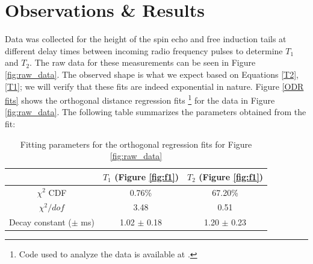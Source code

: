 \documentclass[a4paper, 12pt]{article}  %
\begin{document}
% 


\section{Observations \& Results}\label{results}

Data was collected for the height of the spin echo and free induction tails at different delay times between incoming radio frequency pulses to determine $T_1$ and $T_2$. The raw data for these measurements can be seen in Figure \ref{fig:raw_data}. The observed shape is what we expect based on Equations \ref{T2}, \ref{T1}; we will verify that these fits are indeed exponential in nature. Figure \ref{ODR fits} shows the orthogonal distance regression fits \footnote{Code used to analyze the data is available at \cite{ODR}.} for the data in Figure \ref{fig:raw_data}. The following table summarizes the parameters obtained from the fit:

\begin{table}[htb]
    \centering
    \begin{tabular}{|c|c|c|}
    \hline
         & $T_1$ (Figure \ref{fig:f1}) & $T_2$ (Figure \ref{fig:f1})\\
        \hline
        $\chi^2$ CDF & 0.76\% & 67.20\% \\
        
        $\chi^2 / dof$ & 3.48 & 0.51  \\
        
        Decay constant ($\pm$ ms) & 1.02 $\pm$ 0.18 & 1.20 $\pm$ 0.23          \\
        \hline
    \end{tabular}
    \caption{Fitting parameters for the orthogonal regression fits for Figure \ref{fig:raw_data}}
    \label{tab:fit_parameters}
\end{table}
\end{document}
